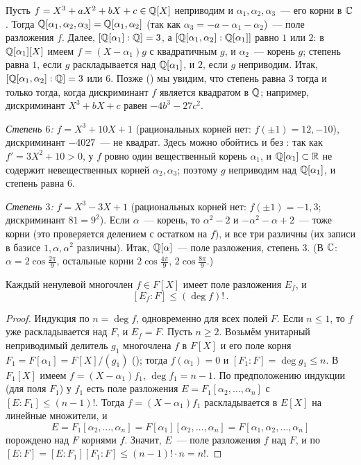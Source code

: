 \begin{example}[2.6]
Пусть $f=X^3+aX^2+bX+c\in\mathbb Q[X]$ неприводим и $\alpha_1,\alpha_2,\alpha_3$~--- его корни в $\mathbb C$. Тогда
$\mathbb Q[\alpha_1,\alpha_2,\alpha_3]=\mathbb Q[\alpha_1,\alpha_2]$ (так как $\alpha_3=-a-\alpha_1-\alpha_2$)~--- поле разложения $f$. Далее,
$[\mathbb Q[\alpha_1]:\mathbb Q]=3$, а $[\mathbb Q[\alpha_1,\alpha_2]:\mathbb Q[\alpha_1]]$ равно $1$ или $2$: в $\mathbb Q[\alpha_1][X]$ имеем
$f=(X-\alpha_1)g$ с квадратичным $g$, и $\alpha_2$~--- корень $g$; степень равна $1$, если $g$ раскладывается над
$\mathbb Q[\alpha_1]$, и $2$, если $g$ неприводим. Итак, $[\mathbb Q[\alpha_1,\alpha_2]:\mathbb Q]=3$ или $6$. Позже () мы увидим, что
степень равна $3$ тогда и только тогда, когда дискриминант $f$ является квадратом в $\mathbb Q$; например, дискриминант
$X^3+bX+c$ равен $-4b^3-27c^2$.

\emph{Степень $6$:} $f=X^3+10X+1$ (рациональных корней нет: $f(\pm1)=12,-10$), дискриминант $-4027$~--- не квадрат.
Здесь можно обойтись и без : так как $f'=3X^2+10>0$, у $f$ ровно один вещественный корень $\alpha_1$, и
$\mathbb Q[\alpha_1]\subset\mathbb R$ не содержит невещественных корней $\alpha_2,\alpha_3$; поэтому $g$ неприводим над $\mathbb Q[\alpha_1]$, и
степень равна $6$.

\emph{Степень $3$:} $f=X^3-3X+1$ (рациональных корней нет: $f(\pm1)=-1,3$; дискриминант $81=9^2$). Если $\alpha$~--- корень, то $\alpha^2-2$ и $-\alpha^2-\alpha+2$~---
тоже корни (это проверяется делением с остатком на $f$), и все три различны (их записи в базисе $1,\alpha,\alpha^2$
различны). Итак, $\mathbb Q[\alpha]$~--- поле разложения, степень $3$. (В $\mathbb C$: $\alpha=2\cos\frac{2\pi}9$, остальные корни
$2\cos\frac{4\pi}9$, $2\cos\frac{8\pi}9$.)
\end{example}

\begin{proposition}[2.7]
Каждый ненулевой многочлен $f\in F[X]$ имеет поле разложения $E_f$, и
\[
[E_f:F]\le(\deg f)!\,.
\]
\end{proposition}

\begin{proof}
Индукция по $n=\deg f$, одновременно для всех полей $F$. Если $n\le1$, то $f$ уже раскладывается над $F$, и $E_f=F$.
Пусть $n\ge2$. Возьмём унитарный неприводимый делитель $g_1$ многочлена $f$ в $F[X]$ и его поле корня
$F_1=F[\alpha_1]=F[X]/(g_1)$ (); тогда $f(\alpha_1)=0$ и $[F_1:F]=\deg g_1\le n$. В $F_1[X]$ имеем
$f=(X-\alpha_1)f_1$, $\deg f_1=n-1$. По предположению индукции (для поля $F_1$) у $f_1$ есть поле разложения
$E=F_1[\alpha_2,\dots,\alpha_n]$ с $[E:F_1]\le(n-1)!$. Тогда $f=(X-\alpha_1)f_1$ раскладывается в $E[X]$ на линейные
множители, и
\[
E=F_1[\alpha_2,\dots,\alpha_n]=F[\alpha_1][\alpha_2,\dots,\alpha_n]=F[\alpha_1,\alpha_2,\dots,\alpha_n]
\]
порождено над $F$ корнями $f$. Значит, $E$~--- поле разложения $f$ над $F$, и по 
$[E:F]=[E:F_1][F_1:F]\le(n-1)!\cdot n=n!$.
\end{proof}

